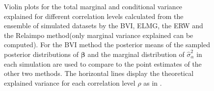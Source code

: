 \begin{figure}[!ht]
  \centering
  \hfill
  \caption{Violin plots for the total marginal and conditional variance explained for different correlation levels calculated from the ensemble of simulated datasets by the BVI, ELMG, the ERW and the Relaimpo method(only marginal variance explained can be computed). For the BVI method the posterior means of the sampled posterior distributions of $\boldsymbol{\beta}$ and the marginal distribution of $\hat{\sigma}^2_{\alpha}$ in each simulation are used to compare to the point estimates of the other two methods. The horizontal lines display the theoretical explained variance for each correlation level $\rho$ as in .}
  \label{fig:total_variance}
\end{figure}

\newpage
